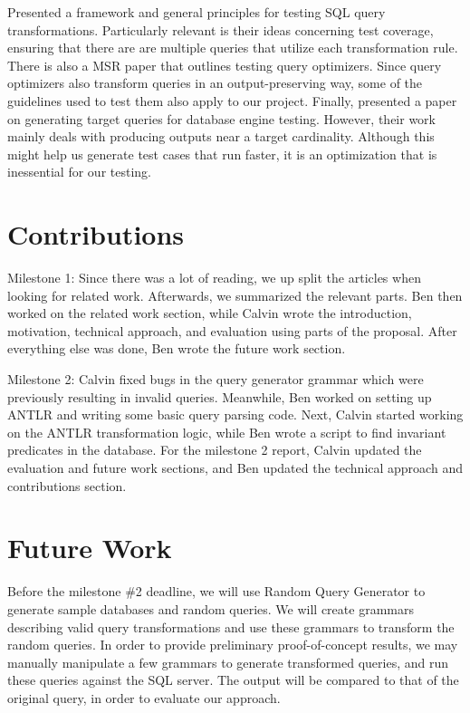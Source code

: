 \documentclass[conference]{acmsiggraph}
\begin{document}
\cite{Elmongui:2009:FTQ:1559845.1559874} Presented a framework and general principles for testing SQL query transformations. Particularly relevant is their ideas concerning test coverage, ensuring that there are are multiple queries that utilize each transformation rule. There is also a MSR paper \cite{Grabs:2008:TCE:1385269.1385272} that outlines testing query optimizers. Since query optimizers also transform queries in an output-preserving way, some of the guidelines used to test them also apply to our project. 
Finally, \cite{Mishra:2008:GTQ:1376616.1376668} presented a paper on generating target queries for database engine testing. However, their work mainly deals with producing outputs near a target cardinality. Although this might help us generate test cases that run faster, it is an optimization that is inessential for our testing.

\section{Contributions}

Milestone 1: Since there was a lot of reading, we up split the articles when looking for related work. Afterwards, we summarized the relevant parts. Ben then worked on the related work section, while Calvin wrote the introduction, motivation, technical approach, and evaluation using parts of the proposal. After everything else was done, Ben wrote the future work section.

Milestone 2: Calvin fixed bugs in the query generator grammar which were previously resulting in invalid queries. Meanwhile, Ben worked on setting up ANTLR and writing some basic query parsing code. Next, Calvin started working on the ANTLR transformation logic, while Ben wrote a script to find invariant predicates in the database. For the milestone 2 report, Calvin updated the evaluation and future work sections, and Ben updated the technical approach and contributions section.

\section{Future Work}

Before the milestone \#2 deadline, we will use Random Query Generator to generate sample databases and random queries. We will create grammars describing valid query transformations and use these grammars to transform the random queries. In order to provide preliminary proof-of-concept results, we may manually manipulate a few grammars to generate transformed queries, and run these queries against the SQL server. The output will be compared to that of the original query, in order to evaluate our approach.
\end{document}
